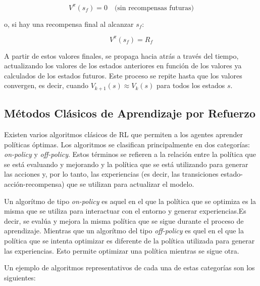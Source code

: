 \documentclass[a4paper,12pt, twoside]{report}
\begin{document}
\begin{equation}
V^\pi(s_f) = 0 \quad \text{(sin recompensas futuras)} 
\end{equation}

o, si hay una recompensa final al alcanzar \(s_f\):

\begin{equation}
V^\pi(s_f) = R_f
\end{equation}

A partir de estos valores finales, se propaga hacia atrás a través del tiempo, actualizando 
los valores de los estados anteriores en función de los valores ya calculados de los estados 
futuros. Este proceso se repite hasta que los valores convergen, es decir, cuando \(V_{k+1}(s) 
\approx V_k(s)\) para todos los estados \(s\).


\subsection{Métodos Clásicos de Aprendizaje por Refuerzo}

Existen varios algoritmos clásicos de RL que permiten a los agentes aprender políticas óptimas. Los 
algoritmos se clasifican principalmente en dos categorías: \textit{on-policy} y \textit{off-policy}. 
Estos términos se refieren a la relación entre la política que se está evaluando y mejorando y la 
política que se está utilizando para generar las acciones y, por lo tanto, las experiencias (es decir, 
las transiciones estado-acción-recompensa) que se utilizan para actualizar el modelo.

Un algorítmo de tipo \textit{on-policy} es aquel en el que la política que se optimiza es la misma que 
se utiliza para interactuar con el entorno y generar experiencias.Es decir, se evalúa y mejora la misma
política que se sigue durante el proceso de aprendizaje. Mientras que un algorítmo del tipo \textit{off-policy}
es quel en el que la política que se intenta optimizar es diferente de la política utilizada para generar
las experiencias. Esto permite optimizar una política mientras se sigue otra.

Un ejemplo de algoritmos representativos de cada una de estas categorías son los siguientes:
\end{document}
